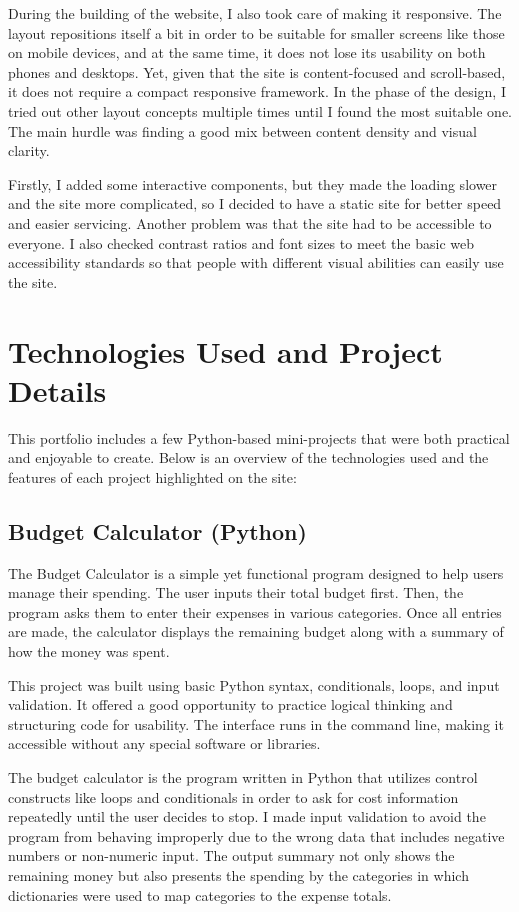 \documentclass[12pt,a4paper]{article}
\begin{document}
During the building of the website, I also took care of making it responsive. The layout repositions itself a bit in order to be suitable for smaller screens like those on mobile devices, and at the same time, it does not lose its usability on both phones and desktops. Yet, given that the site is content-focused and scroll-based, it does not require a compact responsive framework.
In the phase of the design, I tried out other layout concepts multiple times until I found the most suitable one. The main hurdle was finding a good mix between content density and visual clarity. 

Firstly, I added some interactive components, but they made the loading slower and the site more complicated, so I decided to have a static site for better speed and easier servicing. Another problem was that the site had to be accessible to everyone. I also checked contrast ratios and font sizes to meet the basic web accessibility standards so that people with different visual abilities can easily use the site.


\section{Technologies Used and Project Details}

This portfolio includes a few Python-based mini-projects that were both practical and enjoyable to create. Below is an overview of the technologies used and the features of each project highlighted on the site:

\subsection{Budget Calculator (Python)}
The Budget Calculator is a simple yet functional program designed to help users manage their spending. The user inputs their total budget first. Then, the program asks them to enter their expenses in various categories. Once all entries are made, the calculator displays the remaining budget along with a summary of how the money was spent.

This project was built using basic Python syntax, conditionals, loops, and input validation. It offered a good opportunity to practice logical thinking and structuring code for usability. The interface runs in the command line, making it accessible without any special software or libraries.

The budget calculator is the program written in Python that utilizes control constructs like loops and conditionals in order to ask for cost information repeatedly until the user decides to stop. I made input validation to avoid the program from behaving improperly due to the wrong data that includes negative numbers or non-numeric input. The output summary not only shows the remaining money but also presents the spending by the categories in which dictionaries were used to map categories to the expense totals.
\end{document}
